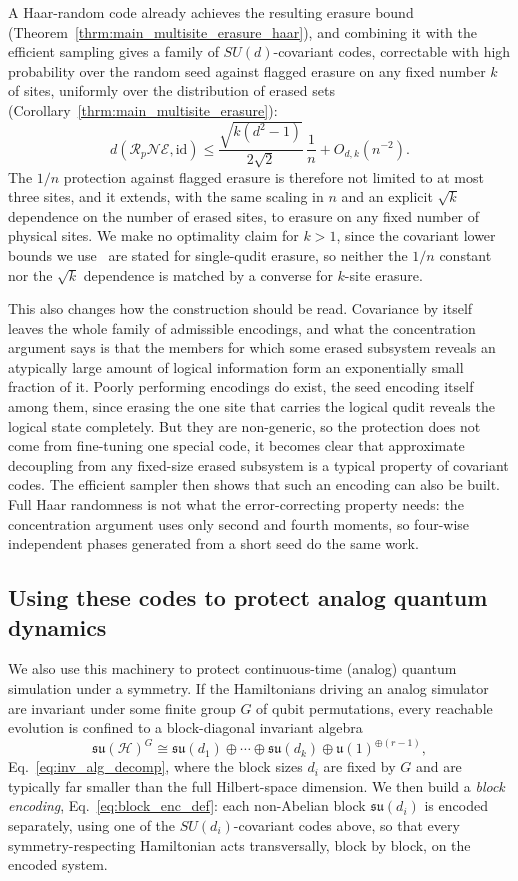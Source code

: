 \documentclass[10pt,twocolumn,superscriptaddress,aps,amsmath,amssymb,citeautoscript,floatfix,prx]{revtex4-2}
\newcounter{alg}
\theoremstyle{plain}
\theoremstyle{plain}
\theoremstyle{plain}
\theoremstyle{plain}
\theoremstyle{plain}
\theoremstyle{plain}
\theoremstyle{plain}
\theoremstyle{definition}
\theoremstyle{plain}
\begin{document}
A Haar-random code already achieves the resulting erasure bound (Theorem~\ref{thrm:main_multisite_erasure_haar}), and combining it with the efficient sampling gives 
a family of $SU(d)$-covariant codes, correctable with high probability over the random seed against flagged erasure on any fixed number $k$ of sites, uniformly over the distribution of erased sets 
(Corollary~\ref{thrm:main_multisite_erasure}):
$$
d(\mathcal R_p\mathcal N\mathcal E,\mathrm{id})\le \frac{\sqrt{k(d^2-1)}}{2\sqrt2}\,\frac1n+O_{d,k}(n^{-2}).
$$
The $1/n$ protection against flagged erasure is therefore not limited to at most three sites, and it extends, with the same scaling in $n$ and an explicit $\sqrt k$ dependence on the number of erased sites, to erasure on any fixed number of physical sites. We make no optimality claim for $k>1$, 
since the covariant lower bounds we use~\cite{Faist2020,Zhou2021} are stated for single-qudit erasure, so neither the $1/n$ constant nor the $\sqrt k$ dependence is matched by a converse for $k$-site erasure.

This also changes how the construction should be read. Covariance by itself leaves the whole family of admissible encodings, and what the concentration argument says is that the members for which some erased subsystem reveals an atypically large amount of 
logical information form an exponentially small fraction of it. Poorly performing encodings do exist, the seed encoding itself among them, since erasing the one site that carries the logical qudit reveals the logical state completely. But they are non-generic, so the protection does not come from 
fine-tuning one special code, it becomes clear that approximate decoupling from any fixed-size erased subsystem is a typical property of covariant codes.
The efficient sampler then shows that such an encoding can also be built. Full Haar randomness is not what the error-correcting property needs: the concentration argument uses only second and fourth moments, so four-wise independent phases generated from a short seed do the same work.

\subsection{Using these codes to protect analog quantum dynamics}\label{subsec:summary_analog}
 
We also use this machinery to protect continuous-time (analog) quantum simulation under a symmetry. If the Hamiltonians driving an analog simulator are invariant under some finite group $G$ of qubit permutations, 
every reachable evolution is confined to a block-diagonal invariant algebra
$$
\mathfrak{su}(\mathcal H)^G\cong \mathfrak{su}(d_1)\oplus\cdots\oplus\mathfrak{su}(d_k)\oplus\mathfrak u(1)^{\oplus(r-1)},
$$
Eq.~\eqref{eq:inv_alg_decomp}, where the block sizes $d_i$ are fixed by $G$ and are typically far smaller than the full Hilbert-space dimension. 
We then build a \emph{block encoding}, Eq.~\eqref{eq:block_enc_def}: each non-Abelian block $\mathfrak{su}(d_i)$ is encoded separately, using one of the $SU(d_i)$-covariant codes above, 
so that every symmetry-respecting Hamiltonian acts transversally, block by block, on the encoded system.
 
\end{document}
